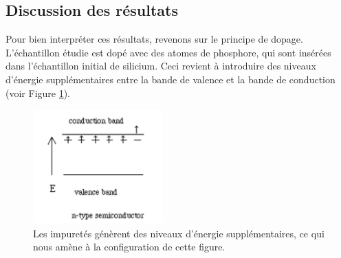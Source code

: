 \subsection{Discussion des résultats}
Pour bien interpréter ces résultats, revenons sur le principe de dopage. L'échantillon étudie est dopé avec des atomes de phosphore, qui sont insérées dans l'échantillon initial de silicium. Ceci revient à introduire des niveaux d'énergie supplémentaires entre la bande de valence et la bande de conduction (voir Figure \ref{doping}).

\begin{figure}[ht]
  \begin{center}
		\includegraphics[width=5cm]{./images/doping.png}
		\caption{Les impuretés génèrent des niveaux d'énergie supplémentaires, ce qui nous amène à la configuration de cette figure.}
		\label{doping}
	\end{center}
\end{figure}

